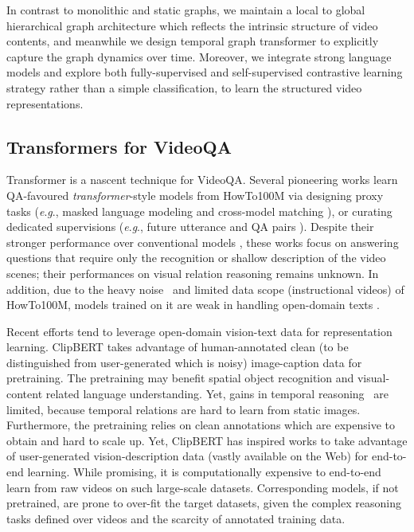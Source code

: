 \documentclass[10pt,journal,compsoc]{IEEEtran}
\newcommand{\trans}{\emph{transformer}}
\newcommand{\eg}{\textit{e}.\textit{g}.}
\begin{document}
In contrast to monolithic and static graphs, we maintain a local to global hierarchical graph architecture which reflects the intrinsic structure of video contents, and meanwhile we design temporal graph transformer to explicitly capture the graph dynamics over time. Moreover, we integrate strong language models and explore both fully-supervised and self-supervised contrastive learning strategy rather than a simple classification, to learn the structured video representations. 

\subsection{Transformers for VideoQA}
Transformer is a nascent technique for VideoQA. 
Several pioneering works \cite{seo2021look,yang2021just,zhu2020actbert} learn QA-favoured \trans-style models from HowTo100M \cite{miech2019howto100m} via designing proxy tasks (\eg, masked language modeling \cite{devlin2018bert} and cross-model matching \cite{radford2021learning,zhu2020actbert}), or curating dedicated supervisions (\eg, future utterance \cite{seo2021look} and QA pairs \cite{yang2021just}). Despite their stronger performance over conventional models \cite{gao2018motion,fan2019heterogeneous,liu2021hair,jiang2020reasoning,park2021bridge}, these works focus on answering questions that require only the recognition \cite{xu2017video} or shallow description \cite{yu2018joint} of the video scenes; their performances on visual relation reasoning \cite{jang2017tgif,xiao2021next,wu2021star} remains unknown. In addition, due to the heavy noise~\cite{amrani2021noise,miech2020end} and limited data scope (instructional videos) of
HowTo100M, models trained on it are weak in handling open-domain texts \cite{bain2021frozen,zellers2021merlot}. 



Recent efforts tend to leverage open-domain vision-text data for representation learning. ClipBERT \cite{lei2021less} takes advantage of human-annotated clean (to be distinguished from user-generated which is noisy) image-caption data \cite{lin2014microsoft,krishna2017visual} for pretraining. The pretraining may benefit spatial object recognition and visual-content related language understanding. Yet, gains in temporal reasoning~\cite{jang2017tgif} are limited, because temporal relations are hard to learn from static images. Furthermore, the pretraining relies on clean annotations which are expensive to obtain and hard to scale up. Yet, ClipBERT has inspired works \cite{fu2021violet,zellers2021merlot} to take advantage of user-generated vision-description data (vastly available on the Web) \cite{sharma2018conceptual,bain2021frozen,zellers2021merlot} for end-to-end learning. While promising, it is computationally expensive to end-to-end learn from raw videos on such large-scale datasets. Corresponding models, if not pretrained, are prone to over-fit the target datasets, given the complex reasoning tasks defined over videos \cite{xiao2021next,wu2021star} and the scarcity of annotated training data. 
\end{document}
